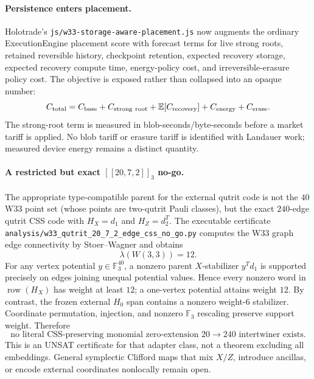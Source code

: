 \paragraph{Persistence enters placement.}
Holotrade's \texttt{js/w33-storage-aware-placement.js} now augments the ordinary
ExecutionEngine placement score with forecast terms for live strong roots,
retained reversible history, checkpoint retention, expected recovery storage,
expected recovery compute time, energy-policy cost, and irreversible-erasure
policy cost.  The objective is exposed rather than collapsed into an opaque
number:
\[
C_{\rm total}=C_{\rm base}+C_{\rm strong\ root}
 +\mathbb E[C_{\rm recovery}]+C_{\rm energy}+C_{\rm erase}.
\]
The strong-root term is measured in blob-seconds/byte-seconds before a market
tariff is applied.  No blob tariff or erasure tariff is identified with
Landauer work; measured device energy remains a distinct quantity.

\paragraph{A restricted but exact $[[20,7,2]]_3$ no-go.}
The appropriate type-compatible parent for the external qutrit code is not the
$40$ W33 point set (whose points are two-qutrit Pauli classes), but the exact
$240$-edge qutrit CSS code with $H_X=d_1$ and $H_Z=d_2^T$.  The executable
certificate \texttt{analysis/w33\_qutrit\_20\_7\_2\_edge\_css\_no\_go.py}
computes the W33 graph edge connectivity by Stoer--Wagner and obtains
\[
\lambda(W(3,3))=12.
\]
For any vertex potential $y\in\mathbb F_3^{40}$, a nonzero parent
$X$-stabilizer $y^Td_1$ is supported precisely on edges joining unequal
potential values.  Hence every nonzero word in $\operatorname{row}(H_X)$ has
weight at least $12$; a one-vertex potential attains weight $12$.  By contrast,
the frozen external $H_0$ span contains a nonzero weight-$6$ stabilizer.
Coordinate permutation, injection, and nonzero $\mathbb F_3$ rescaling preserve
support weight.  Therefore
\[
\boxed{\text{no literal CSS-preserving monomial zero-extension }20\to240
\text{ intertwiner exists}.}
\]
This is an UNSAT certificate for that adapter class, not a theorem excluding
all embeddings.  General symplectic Clifford maps that mix $X/Z$, introduce
ancillas, or encode external coordinates nonlocally remain open.

